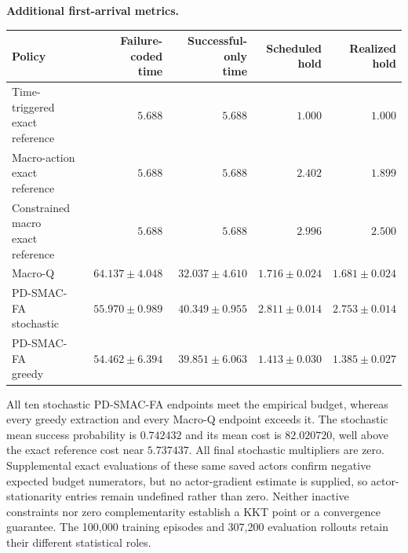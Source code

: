 \documentclass[11pt]{article}
\newcommand{\1}{\mathbf{1}}
\begin{document}
\begin{table}[tbp]
\centering\footnotesize
\textbf{Additional first-arrival metrics.}\\[3pt]
\setlength{\tabcolsep}{3pt}
\begin{tabular*}{\textwidth}{@{\extracolsep{\fill}}lrrrr@{}}
\toprule
Policy & \shortstack{Failure-coded\\time} & \shortstack{Successful-only\\time} & \shortstack{Scheduled\\hold} & \shortstack{Realized\\hold} \\
\midrule
\shortstack[l]{Time-triggered\\exact reference} & $5.688$ & $5.688$ & $1.000$ & $1.000$ \\[2pt]
\shortstack[l]{Macro-action\\exact reference} & $5.688$ & $5.688$ & $2.402$ & $1.899$ \\[2pt]
\shortstack[l]{Constrained macro\\exact reference} & $5.688$ & $5.688$ & $2.996$ & $2.500$ \\[2pt]
Macro-Q & $64.137 \pm 4.048$ & $32.037 \pm 4.610$ & $1.716 \pm 0.024$ & $1.681 \pm 0.024$ \\[2pt]
\shortstack[l]{PD-SMAC-FA\\stochastic} & $55.970 \pm 0.989$ & $40.349 \pm 0.955$ & $2.811 \pm 0.014$ & $2.753 \pm 0.014$ \\[2pt]
\shortstack[l]{PD-SMAC-FA\\greedy} & $54.462 \pm 6.394$ & $39.851 \pm 6.063$ & $1.413 \pm 0.030$ & $1.385 \pm 0.027$ \\[2pt]
\bottomrule
\end{tabular*}
\end{table}

All ten stochastic PD-SMAC-FA endpoints meet the empirical budget, whereas every greedy extraction and every Macro-Q endpoint exceeds it. The stochastic mean success probability is $0.742432$ and its mean cost is $82.020720$, well above the exact reference cost near $5.737437$. All final stochastic multipliers are zero. Supplemental exact evaluations of these same saved actors confirm negative expected budget numerators, but no actor-gradient estimate is supplied, so actor-stationarity entries remain undefined rather than zero. Neither inactive constraints nor zero complementarity establish a KKT point or a convergence guarantee. The 100,000 training episodes and 307,200 evaluation rollouts retain their different statistical roles.
\end{document}
